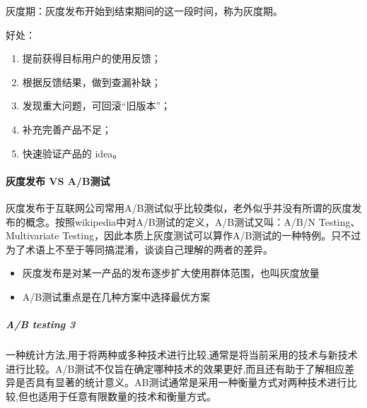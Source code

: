 \documentclass[letterpaper,11pt,english]{sphinxmanual}
\begin{document}
灰度期：灰度发布开始到结束期间的这一段时间，称为灰度期。

好处：
\begin{enumerate}
%
\item {} 
提前获得目标用户的使用反馈；

\item {} 
根据反馈结果，做到查漏补缺；

\item {} 
发现重大问题，可回滚“旧版本”；

\item {} 
补充完善产品不足；

\item {} 
快速验证产品的 idea。

\end{enumerate}


\paragraph{灰度发布 VS A/B测试}
\label{\detokenize{chapter_AI_dive/huidu:vs-a-b}}
灰度发布于互联网公司常用A/B测试似乎比较类似，老外似乎并没有所谓的灰度发布的概念。按照wikipedia中对A/B测试的定义，A/B测试又叫：A/B/N
Testing、Multivariate
Testing，因此本质上灰度测试可以算作A/B测试的一种特例。只不过为了术语上不至于等同搞混淆，谈谈自己理解的两者的差异。
\begin{itemize}
\item {} 
灰度发布是对某一产品的发布逐步扩大使用群体范围，也叫灰度放量

\item {} 
A/B测试重点是在几种方案中选择最优方案%
\begin{footnote}[864]\sphinxAtStartFootnote
{}
%
\end{footnote}

\end{itemize}


\subparagraph{A/B testing 3\sphinxfootnotemark[865]}
\label{\detokenize{chapter_AI_dive/huidu:a-b-testing-3}}%
\begin{footnotetext}[865]\sphinxAtStartFootnote
{}
%
\end{footnotetext}\ignorespaces 
一种统计方法,用于将两种或多种技术进行比较,通常是将当前采用的技术与新技术进行比较。A/B测试不仅旨在确定哪种技术的效果更好,而且还有助于了解相应差异是否具有显著的统计意义。AB测试通常是采用一种衡量方式对两种技术进行比较,但也适用于任意有限数量的技术和衡量方式。
\end{document}
